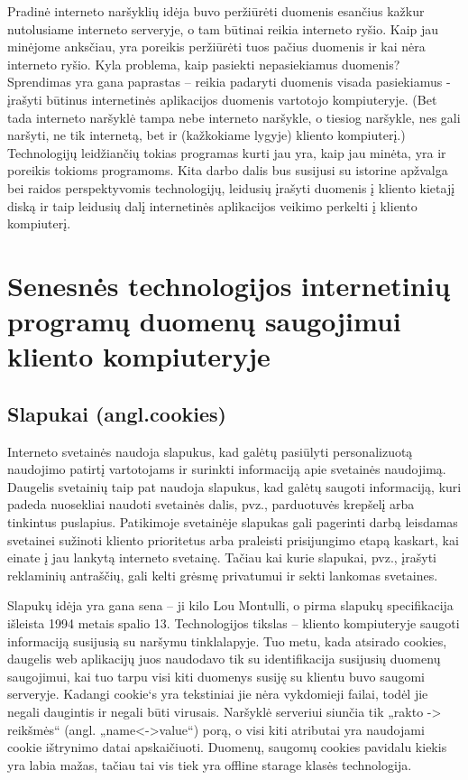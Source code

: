 \documentclass[12pt,a4paper,titlepage]{article}
\begin{document}
Pradinė interneto naršyklių idėja buvo peržiūrėti duomenis esančius kažkur nutolusiame interneto serveryje, o tam būtinai reikia interneto ryšio. Kaip jau minėjome anksčiau, yra poreikis peržiūrėti tuos pačius duomenis ir kai nėra interneto ryšio. Kyla problema, kaip pasiekti nepasiekiamus duomenis? Sprendimas yra gana paprastas – reikia padaryti duomenis visada pasiekiamus - įrašyti būtinus internetinės aplikacijos duomenis vartotojo kompiuteryje. (Bet tada interneto naršyklė tampa nebe interneto naršykle, o tiesiog naršykle, nes gali naršyti, ne tik internetą, bet ir (kažkokiame lygyje) kliento kompiuterį.) Technologijų leidžiančių tokias programas kurti jau yra, kaip jau minėta, yra ir poreikis tokioms programoms. Kita darbo dalis bus susijusi su istorine apžvalga bei raidos perspektyvomis technologijų, leidusių įrašyti duomenis į kliento kietajį diską ir taip leidusių dalį internetinės aplikacijos veikimo perkelti į kliento kompiuterį. 

\section{Senesnės technologijos internetinių programų duomenų saugojimui kliento kompiuteryje}

\subsection{Slapukai (angl.cookies)}

Interneto svetainės naudoja slapukus, kad galėtų pasiūlyti personalizuotą naudojimo patirtį vartotojams ir surinkti informaciją apie svetainės naudojimą. Daugelis svetainių taip pat naudoja slapukus, kad galėtų saugoti informaciją, kuri padeda nuosekliai naudoti svetainės dalis, pvz., parduotuvės krepšelį arba tinkintus puslapius. Patikimoje svetainėje slapukas gali pagerinti darbą leisdamas svetainei sužinoti kliento prioritetus arba praleisti prisijungimo etapą kaskart, kai einate į jau lankytą interneto svetainę. Tačiau kai kurie slapukai, pvz., įrašyti reklaminių antraščių, gali kelti grėsmę privatumui ir sekti lankomas svetaines.

Slapukų idėja yra gana sena – ji kilo Lou Montulli, o  pirma slapukų specifikacija išleista 1994 metais spalio 13. Technologijos tikslas – kliento kompiuteryje saugoti informaciją susijusią su naršymu tinklalapyje. Tuo metu, kada atsirado cookies, daugelis web aplikacijų juos naudodavo tik su identifikacija susijusių duomenų saugojimui, kai tuo tarpu visi kiti duomenys susiję su klientu buvo saugomi serveryje. Kadangi cookie‘s yra tekstiniai jie nėra vykdomieji failai, todėl jie negali daugintis ir negali būti virusais. Naršyklė serveriui siunčia tik „rakto -> reikšmės“ (angl. „name<->value“) porą, o visi kiti atributai yra naudojami cookie ištrynimo datai apskaičiuoti. Duomenų, saugomų cookies pavidalu kiekis yra labia mažas, tačiau tai vis tiek yra offline starage klasės technologija.
\end{document}
